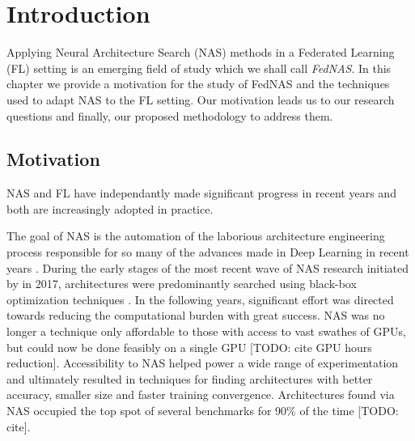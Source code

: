 \chapter{Introduction}\label{chapter:introduction}

Applying Neural Architecture Search (NAS) methods in a Federated Learning (FL) setting is an emerging field of study which we shall call \textit{FedNAS}. In this chapter we provide a motivation for the study of FedNAS and the techniques used to adapt NAS to the FL setting. Our motivation leads us to our research questions and finally, our proposed methodology to address them.

\section{Motivation}

NAS and FL have independantly made significant progress in recent years and both are increasingly adopted in practice. 

The goal of NAS is the automation of the laborious architecture engineering process responsible for so many of the advances made in Deep Learning in recent years \cite{nas_survey_2019}. During the early stages of the most recent wave of NAS research initiated by \cite{nas_with_rl_2017} in 2017, architectures were predominantly searched using black-box optimization techniques \cite{nas_with_rl_2017}. In the following years, significant effort was directed towards reducing the computational burden with great success. NAS was no longer a technique only affordable to those with access to vast swathes of GPUs, but could now be done feasibly on a single GPU [TODO: cite GPU hours reduction]. Accessibility to NAS helped power a wide range of experimentation and ultimately resulted in techniques for finding architectures with better accuracy, smaller size and faster training convergence. Architectures found via NAS occupied the top spot of several benchmarks for 90\% of the time [TODO: cite].


